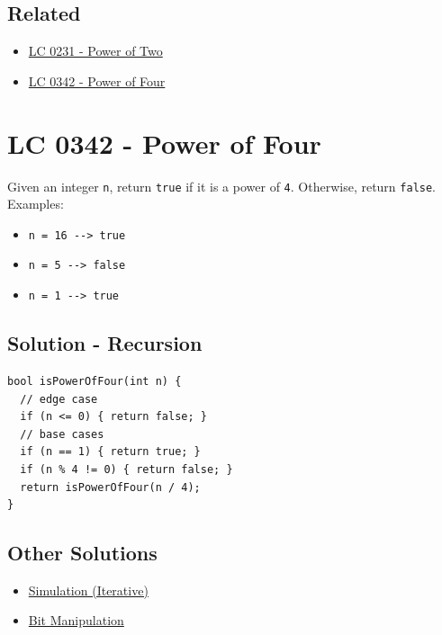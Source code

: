 \subsection*{Related}
\begin{itemize}
\item \hyperref[lc0231]{LC 0231 - Power of Two}
\item \hyperref[lc0342]{LC 0342 - Power of Four}
\end{itemize}

\section{LC 0342 - Power of Four}
Given an integer {\colorbox{CodeBackground}{\lstinline|n|}}, return {\colorbox{CodeBackground}{\lstinline|true|}} if it is a power of {\colorbox{CodeBackground}{\lstinline|4|}}. Otherwise, return {\colorbox{CodeBackground}{\lstinline|false|}}.\\

Examples:
\begin{itemize}
\item {\colorbox{CodeBackground}{\lstinline|n = 16 --> true|}}
\item {\colorbox{CodeBackground}{\lstinline|n = 5 --> false|}}
\item {\colorbox{CodeBackground}{\lstinline|n = 1 --> true|}}
\end{itemize}

\subsection*{Solution - Recursion}\label{solution:lc0342_simulation_recursion}
\begin{lstlisting}
bool isPowerOfFour(int n) {
  // edge case
  if (n <= 0) { return false; }
  // base cases
  if (n == 1) { return true; }
  if (n % 4 != 0) { return false; }
  return isPowerOfFour(n / 4);
}
\end{lstlisting}

\subsection*{Other Solutions}
\begin{itemize}
\item \hyperref[solution:lc0342_simulation_iterative]{Simulation (Iterative)}
\item \hyperref[solution:lc0342_bit_manipulation]{Bit Manipulation}
\end{itemize}

